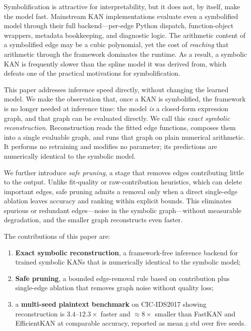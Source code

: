 \documentclass[conference]{IEEEtran}
\begin{document}
Symbolification is attractive for interpretability, but it does not, by itself,
make the model fast. Mainstream KAN implementations evaluate even a symbolified
model through their full backend---per-edge Python dispatch, function-object
wrappers, metadata bookkeeping, and diagnostic logic. The arithmetic content of
a symbolified edge may be a cubic polynomial, yet the cost of \emph{reaching}
that arithmetic through the framework dominates the runtime. As a result, a
symbolic KAN is frequently slower than the spline model it was derived from,
which defeats one of the practical motivations for symbolification.

This paper addresses inference speed directly, without changing the learned
model. We make the observation that, once a KAN is symbolified, the framework
is no longer needed at inference time: the model \emph{is} a closed-form
expression graph, and that graph can be evaluated directly. We call this
\emph{exact symbolic reconstruction}. Reconstruction reads the fitted edge
functions, composes them into a single evaluable graph, and runs that graph on
plain numerical arithmetic. It performs no retraining and modifies no
parameter; its predictions are numerically identical to the symbolic model.

We further introduce \emph{safe pruning}, a stage that removes edges
contributing little to the output. Unlike fit-quality or raw-contribution
heuristics, which can delete important edges, safe pruning admits a removal
only when a direct single-edge ablation leaves accuracy and ranking within
explicit bounds. This eliminates spurious or redundant edges---noise in the
symbolic graph---without measurable degradation, and the smaller graph
reconstructs even faster.

The contributions of this paper are:
\begin{enumerate}
\item \textbf{Exact symbolic reconstruction}, a framework-free inference
backend for trained symbolic KANs that is numerically identical to the
symbolic model;
\item \textbf{Safe pruning}, a bounded edge-removal rule based on
contribution plus single-edge ablation that removes graph noise without
quality loss;
\item a \textbf{multi-seed plaintext benchmark} on CIC-IDS2017 showing
reconstruction is $3.4$--$12.3\times$ faster and $\approx8\times$ smaller than
FastKAN and EfficientKAN at comparable accuracy, reported as mean\,$\pm$\,std
over five seeds.
\end{enumerate}
\end{document}
